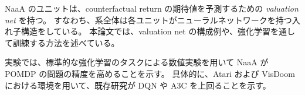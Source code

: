 NaaA のユニットは、counterfactual return の期待値を予測するための
{\em valuation net} を持つ。
すなわち、系全体は各ユニットがニューラルネットワークを持つ入れ子構造をしている。
本論文では、valuation net の構成例や、強化学習を通して訓練する方法を述べている。


実験では、標準的な強化学習のタスクによる数値実験を用いて NaaA が POMDP の問題の精度を高めることを示す。
具体的に、Atari および VisDoom における環境を用いて、既存研究が DQN や A3C を上回ることを示す。

